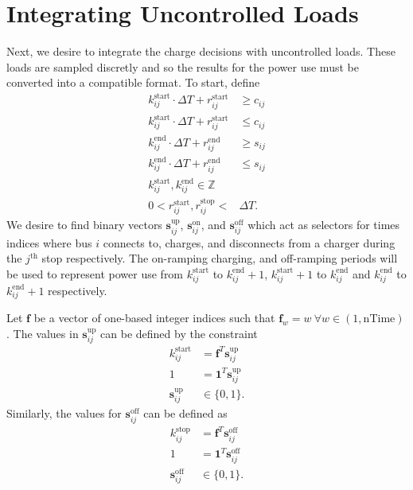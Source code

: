 \section{Integrating Uncontrolled Loads}
Next, we desire to integrate the charge decisions with uncontrolled loads.  These loads are sampled discretly and so the results for the power use must be converted into a compatible format.  To start, define
\begin{equation}
	\begin{aligned}
		k^{\text{start}}_{ij}\cdot\Delta T + r^{\text{start}}_{ij}&\ge c_{ij} \\
		k^{\text{start}}_{ij}\cdot\Delta T + r^{\text{start}}_{ij}&\le c_{ij} \\
		k^{\text{end}}_{ij}\cdot\Delta T + r^{\text{end}}_{ij}&\ge s_{ij} \\
		k^{\text{end}}_{ij}\cdot\Delta T + r^{\text{end}}_{ij}&\le s_{ij} \\
	k^{\text{start}}_{ij}, k^{\text{end}}_{ij} \in \mathbb{Z} \\
	0 < r^{\text{start}}_{ij}, r^{\text{stop}}_{ij} < &\Delta T.
	\end{aligned}
\end{equation}
We desire to find binary vectors $\mathbf{s}^{\text{up}}_{ij}$, $\mathbf{s}^{\text{on}}_{ij}$, and $\mathbf{s}^{\text{off}}_{ij}$ which act as selectors for times indices where bus $i$ connects to, charges, and disconnects from a charger during the $j^{\text{th}}$ stop respectively. The on-ramping charging, and off-ramping periods will be used to represent power use from $k^{\text{start}}_{ij}$ to $k^{\text{end}}_{ij} + 1$, $k^{\text{start}}_{ij} + 1$ to $k^{\text{end}}_{ij}$ and $k^{\text{end}}_{ij}$ to $k^{\text{end}}_{ij} + 1$ respectively. 
\par Let $\mathbf{f}$ be a vector of one-based integer indices such that $\mathbf{f}_w = w \ \forall w \in (1,\text{nTime})$. The values in $\mathbf{s}^{\text{up}}_{ij}$ can be defined by the constraint
\begin{equation}\begin{aligned}
	k^{\text{start}}_{ij} &= \mathbf{f}^T\mathbf{s}^{\text{up}}_{ij} \\
	1 &= \mathbf{1}^T\mathbf{s}^{\text{up}}_{ij} \\
	\mathbf{s}^{\text{up}}_{ij} &\in \{0,1\}.
\end{aligned} \end{equation}
Similarly, the values for $\mathbf{s}^{\text{off}}_{ij}$ can be defined as
\begin{equation} \begin{aligned}
	k^{\text{stop}}_{ij} &= \mathbf{f}^T\mathbf{s}^{\text{off}}_{ij}\\ 
	1 &= \mathbf{1}^T\mathbf{s}^{\text{off}}_{ij} \\
	\mathbf{s}^{\text{off}}_{ij} &\in \{0,1\}.
\end{aligned} \end{equation}
